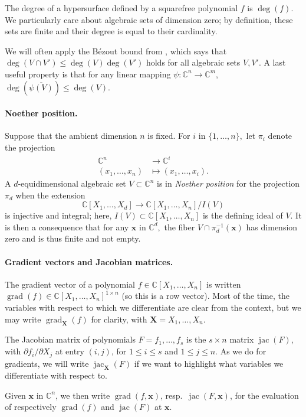 \documentclass[12pt]{article}
\def\xb{{\bm x}}
\DeclareMathOperator{\jac}{jac}
\DeclareMathOperator{\grad}{grad}
\def\C{\mathbb{C}}
\begin{document}
The degree of a hypersurface defined by a squarefree polynomial $f$ is
$\deg(f)$. We particularly care about algebraic sets of dimension zero; by
definition, these sets are finite and their degree is equal to their
cardinality.

We will often apply the B\'ezout bound from \cite[Theorem 1]{H},
which says that $\deg(V \cap V') \le \deg(V) \deg(V')$ holds for all
algebraic sets $V,V'$. A last useful property is that for any linear
mapping $\psi: \C^n \to \C^m$, $\deg(\overline{ \psi(V)}) \le \deg(V)$.

\paragraph*{Noether position.}
Suppose that the ambient dimension $n$ is fixed.  For $i$ in
$\{1,\dots,n\},$ let $\pi_i$ denote the projection
\begin{align*}
\C^n  &\rightarrow \C^i \\
(x_1,\hdots,x_n) &\mapsto  (x_1,\hdots,x_i).    
\end{align*} 
A $d$-equidimensional algebraic set $V \subset \C^n$ is in
\textit{Noether position} for the projection $\pi_d$ when the
extension \[\C[X_1,\hdots,X_{d}] \rightarrow \C[X_1,\hdots,X_n]/I(V)\]
is injective and integral; here, $I(V) \subset \C[X_1,\hdots,X_n]$ is
the defining ideal of $V$. It is then a consequence that for any $\xb$ in
$\C^d,$ the fiber $V \cap \pi_d^{-1}(\xb)$ has dimension zero and is
thus finite and not empty.

\paragraph*{Gradient vectors and Jacobian matrices.} The gradient vector 
of a polynomial $f \in \C[X_1,\dots,X_n]$ is written $\grad(f) \in
\C[X_1,\dots,X_n]^{1 \times n}$ (so this is a row vector). Most of the
time, the variables with respect to which we differentiate are clear
from the context, but we may write $\grad_{\bm X}(f)$ for clarity,
with $\bm X=X_1,\dots,X_n$.

The Jacobian matrix of polynomials $F=f_1,\dots,f_s$ is the $s \times
n$ matrix $\jac(F)$, with $\partial f_i/\partial X_j$ at entry
$(i,j)$, for $1\le i \le s$ and $1 \le j \le n$. As we do for
gradients, we will write $\jac_{\bm X}(F)$ if we want to highlight
what variables we differentiate with respect to.

Given $\xb$ in $\C^n$, we then write $\grad(f,\xb)$, resp.\ $\jac(F,
\xb)$, for the evaluation of respectively $\grad(f)$ and $\jac(F)$ 
at $\xb$.
\end{document}
